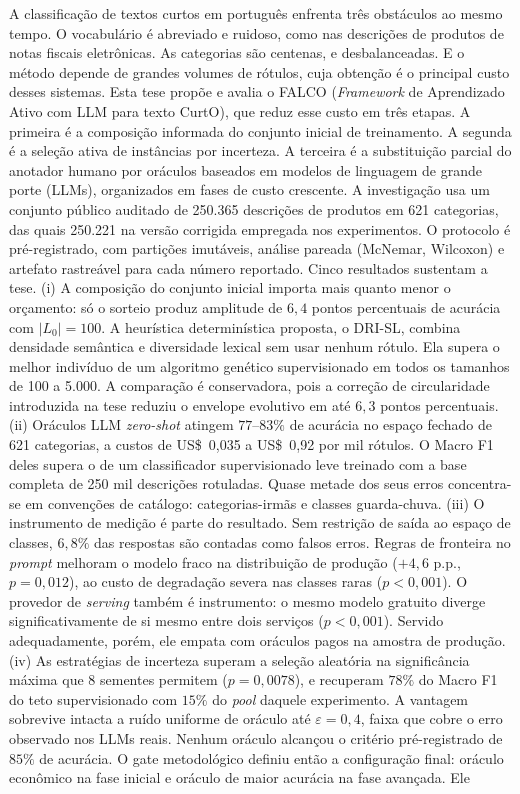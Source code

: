\begin{resumo}

A classificação de textos curtos em português enfrenta três obstáculos ao mesmo tempo. O vocabulário é abreviado e ruidoso, como nas descrições de produtos de notas fiscais eletrônicas. As categorias são centenas, e desbalanceadas. E o método depende de grandes volumes de rótulos, cuja obtenção é o principal custo desses sistemas. Esta tese propõe e avalia o FALCO (\textit{Framework} de Aprendizado Ativo com LLM para texto CurtO), que reduz esse custo em três etapas. A primeira é a composição informada do conjunto inicial de treinamento. A segunda é a seleção ativa de instâncias por incerteza. A terceira é a substituição parcial do anotador humano por oráculos baseados em modelos de linguagem de grande porte (LLMs), organizados em fases de custo crescente. A investigação usa um conjunto público auditado de 250.365 descrições de produtos em 621 categorias, das quais 250.221 na versão corrigida empregada nos experimentos. O protocolo é pré-registrado, com partições imutáveis, análise pareada (McNemar, Wilcoxon) e artefato rastreável para cada número reportado. Cinco resultados sustentam a tese. (i) A composição do conjunto inicial importa mais quanto menor o orçamento: só o sorteio produz amplitude de $6{,}4$ pontos percentuais de acurácia com $|L_0|=100$. A heurística determinística proposta, o DRI-SL, combina densidade semântica e diversidade lexical sem usar nenhum rótulo. Ela supera o melhor indivíduo de um algoritmo genético supervisionado em todos os tamanhos de 100 a 5.000. A comparação é conservadora, pois a correção de circularidade introduzida na tese reduziu o envelope evolutivo em até $6{,}3$ pontos percentuais. (ii) Oráculos LLM \textit{zero-shot} atingem $77$--$83\%$ de acurácia no espaço fechado de 621 categorias, a custos de US\$~0,035 a US\$~0,92 por mil rótulos. O Macro F1 deles supera o de um classificador supervisionado leve treinado com a base completa de 250 mil descrições rotuladas. Quase metade dos seus erros concentra-se em convenções de catálogo: categorias-irmãs e classes guarda-chuva. (iii) O instrumento de medição é parte do resultado. Sem restrição de saída ao espaço de classes, $6{,}8\%$ das respostas são contadas como falsos erros. Regras de fronteira no \textit{prompt} melhoram o modelo fraco na distribuição de produção ($+4{,}6$ p.p., $p=0{,}012$), ao custo de degradação severa nas classes raras ($p<0{,}001$). O provedor de \textit{serving} também é instrumento: o mesmo modelo gratuito diverge significativamente de si mesmo entre dois serviços ($p<0{,}001$). Servido adequadamente, porém, ele empata com oráculos pagos na amostra de produção. (iv) As estratégias de incerteza superam a seleção aleatória na significância máxima que 8 sementes permitem ($p=0{,}0078$), e recuperam $78\%$ do Macro F1 do teto supervisionado com $15\%$ do \textit{pool} daquele experimento. A vantagem sobrevive intacta a ruído uniforme de oráculo até $\varepsilon=0{,}4$, faixa que cobre o erro observado nos LLMs reais. Nenhum oráculo alcançou o critério pré-registrado de $85\%$ de acurácia. O gate metodológico definiu então a configuração final: oráculo econômico na fase inicial e oráculo de maior acurácia na fase avançada. Ele 
\end{resumo}

